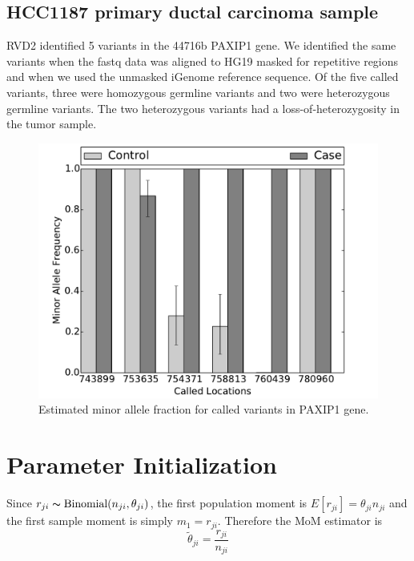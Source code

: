 \documentclass[11pt,reqno]{amsart}
\begin{document}
\subsection{HCC1187 primary ductal carcinoma sample}\label{sec:brca}

RVD2 identified 5 variants in the 44716b PAXIP1 gene. We identified the same variants when the fastq data was aligned to HG19 masked for repetitive regions and when we used the unmasked iGenome reference sequence. Of the five called variants, three were homozygous germline variants and two were heterozygous germline variants. The two heterozygous variants had a loss-of-heterozygosity in the tumor sample.

\begin{figure}[h]
\begin{center}
\includegraphics[width=120mm]{pdf_figs/HCC1187_MuBarPlot.pdf}
\caption{Estimated minor allele fraction for called variants in PAXIP1 gene.}
\label{fig:MAF}
\end{center}
\end{figure}




\appendix

\section{Parameter Initialization}\label{sec:appendix_mom}
Since $r_{ji} \thicksim \text{Binomial}(n_{ji}, \theta_{ji})$, the first population moment is  $E[r_{ji}] = \theta_{ji} n_{ji}$ and the first sample moment is simply $m_1 = r_{ji}$. Therefore the MoM estimator is 
\begin{equation}
	\tilde{\theta}_{ji} = \frac{r_{ji}} {n_{ji}}
\end{equation}
\end{document}
